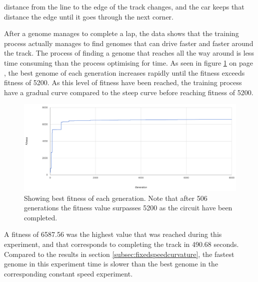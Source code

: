 distance from the line to the edge of the track changes, and the car keeps that distance the edge until it goes through the next corner.

After a genome manages to complete a lap, the data shows that the training process actually manages to find genomes that can drive faster and faster around the track. The process of finding a genome that reaches all the way around is less time consuming than the process optimising for time. As seen in figure \ref{fig:steerspeeddata} on page \pageref{fig:steerspeeddata}, the best genome of each generation increases rapidly until the fitness exceeds fitness of 5200. As this level of fitness have been reached, the training process have a gradual curve compared to the steep curve before reaching fitness of 5200. 


\begin{figure}[h]
\includegraphics[width=\textwidth]{report/images/graphs/steeringandspeedcontrolrun1}
\centering
\caption{Showing best fitness of each generation. Note that after 506 generations the fitness value surpasses 5200 as the circuit have been completed.}
\label{fig:steerspeeddata}
\end{figure}

A fitness of 6587.56 was the highest value that was reached during this experiment, and that corresponds to completing the track in 490.68 seconds. Compared to the results in section \ref{subsec:fixedspeedcurvature}, the fastest genome in this experiment time is slower than the best genome in the corresponding constant speed experiment. 

